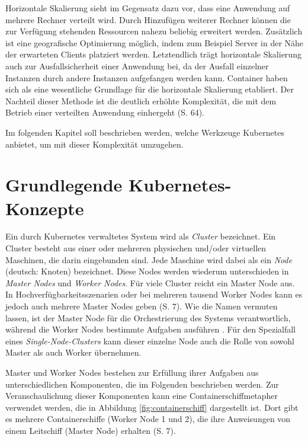 \documentclass[11pt,a4paper]{article}
\begin{document}
Horizontale Skalierung sieht im Gegensatz dazu vor, dass eine Anwendung
auf mehrere Rechner verteilt wird. Durch Hinzufügen weiterer Rechner können die zur Verfügung stehenden Ressourcen nahezu beliebig erweitert werden.
Zusätzlich ist eine geografische Optimierung möglich, indem zum Beispiel Server in der Nähe der erwarteten Clients platziert werden.
Letztendlich trägt horizontale Skalierung auch zur Ausfallsicherheit einer Anwendung bei, da der Ausfall einzelner Instanzen durch andere Instanzen
aufgefangen werden kann.
Container haben sich als eine wesentliche Grundlage für die horizontale Skalierung etabliert.
Der Nachteil dieser Methode ist die deutlich erhöhte Komplexität,
die mit dem Betrieb einer verteilten Anwendung einhergeht \cite{Schmeling_Dargatz_2022} (S. 64).

Im folgenden Kapitel soll beschrieben werden, welche Werkzeuge Kubernetes anbietet, um mit dieser Komplexität umzugehen.

\section{Grundlegende Kubernetes-Konzepte}
\label{sec:Grundlegende_Kubernetes-Konzepte}
Ein durch Kubernetes verwaltetes System wird als \emph{Cluster} bezeichnet.
Ein Cluster besteht aus einer oder mehreren physischen und/oder virtuellen Maschinen, die darin eingebunden sind.
Jede Maschine wird dabei als ein \emph{Node} (deutsch: Knoten) bezeichnet. Diese Nodes werden wiederum unterschieden in
\emph{Master Nodes} und \emph{Worker Nodes}.
Für viele Cluster reicht ein Master Node aus. In Hochverfügbarkeitsszenarien oder bei mehreren
tausend Worker Nodes kann es jedoch auch mehrere Master Nodes geben \cite{Schmeling_Dargatz_2022} (S. 7).
Wie die Namen vermuten lassen, ist der Master Node für die Orchestrierung
des Systems verantwortlich, während die Worker Nodes bestimmte Aufgaben ausführen \cite{Bentaleb_Belloum_Sebaa_El-Maouhab_2021}.
Für den Spezialfall eines \emph{Single-Node-Clusters} kann dieser einzelne Node auch die Rolle von sowohl
Master als auch Worker übernehmen.

Master und Worker Nodes bestehen zur Erfüllung ihrer Aufgaben aus unterschiedlichen Komponenten,
die im Folgenden beschrieben werden.
Zur Veranschaulichung dieser Komponenten kann eine Containerschiffmetapher verwendet werden,
die in Abbildung \ref{fig:containerschiff} dargestellt ist. Dort gibt es mehrere Containerschiffe
(Worker Node 1 und 2), die ihre Anweisungen von einem Leitschiff (Master Node) erhalten \cite{Schmeling_Dargatz_2022} (S. 7).
\end{document}

